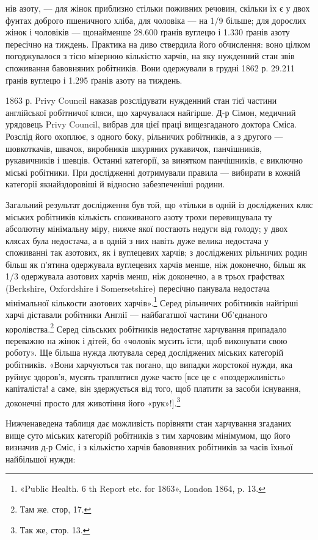 нів азоту, — для жінок приблизно стільки поживних речовин,
скільки їх є у двох фунтах доброго пшеничного хліба, для чоловіка — на 1/9 більше; для дорослих
жінок і чоловіків — щонайменше
28.600 ґранів вуглецю і 1.330 ґранів азоту пересічно на тиждень.
Практика на диво ствердила його обчислення: воно цілком погоджувалося
з тією мізерною кількістю харчів, на яку нужденний
стан звів споживання бавовняних робітників. Вони одержували
в грудні 1862 р. 29.211 ґранів вуглецю і 1.295 ґранів азоту
на тиждень.

1863 р. Privy Council наказав розслідувати нужденний стан
тієї частини англійської робітничої кляси, що харчувалася найгірше.
Д-р Сімон, медичний урядовець Privy Council, вибрав
для цієї праці вищезгаданого доктора Сміса. Розслід його охоплює,
з одного боку, рільничих робітників, а з другого — шовкоткачів,
швачок, виробників шкуряних рукавичок, панчішників,
рукавичників і шевців. Останні категорії, за винятком панчішників,
є виключно міські робітники. При дослідженні дотримували
правила — вибирати в кожній категорії якнайздоровіші
й відносно забезпеченіші родини.

Загальний результат дослідження був той, що «тільки в
одній із досліджених кляс міських робітників кількість споживаного
азоту трохи перевищувала ту абсолютну мінімальну
міру, нижче якої постають недуги від голоду; у двох клясах
була недостача, а в одній з них навіть дуже велика недостача
у споживанні так азотових, як і вуглецевих харчів; з досліджених
рільничих родин більш як п’ятина одержувала вуглецевих
харчів менше, ніж доконечно, більш як 1/3 одержувала
азотових харчів менш, ніж доконечно, а в трьох графствах
(Berkshire, Oxfordshire і Somersetshire) пересічно панувала недостача
мінімальної кількости азотових харчів».\footnote{
«Public Health. 6 th Report etc. for 1863», London 1864, p. 13.
} Серед рільничих
робітників найгірші харчі діставали робітники Англії —
найбагатшої частини Об’єднаного королівства.\footnote{
Там же. стор, 17.
} Серед сільських
робітників недостатнє харчування припадало переважно
на жінок і дітей, бо «чоловік мусить їсти, щоб виконувати свою
роботу». Ще більша нужда лютувала серед досліджених міських
категорій робітників. «Вони харчуються так погано, що випадки
жорстокої нужди, яка руйнує здоров’я, мусять траплятися дуже
часто [все це є «поздержливість» капіталіста! а саме, він здержується
від того, щоб платити за засоби існування, доконечні
просто для животіння його «рук»!].\footnote{
Так же, стор. 13.
}

Нижченаведена таблиця дає можливість порівняти стан харчування
згаданих вище суто міських категорій робітників з
тим харчовим мінімумом, що його визначив д-р Сміс, і з
кількістю харчів бавовняних робітників за часів їхньої найбільшої
нужди: